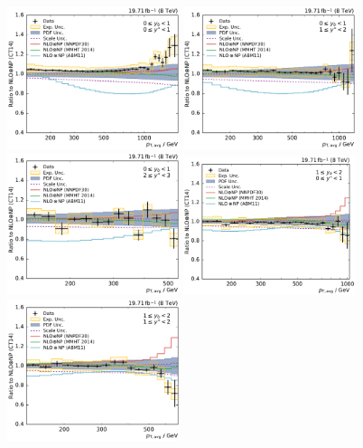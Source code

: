 \begin{figure}[htbp]
    \centering
    \includegraphics[width=0.45\textwidth]{figures/measurement/ratio_to_CT14nlo+np_totcomp_yb0ys0.pdf}\hfill
    \includegraphics[width=0.45\textwidth]{figures/measurement/ratio_to_CT14nlo+np_totcomp_yb0ys1.pdf}
    \includegraphics[width=0.45\textwidth]{figures/measurement/ratio_to_CT14nlo+np_totcomp_yb0ys2.pdf}\hfill
    \includegraphics[width=0.45\textwidth]{figures/measurement/ratio_to_CT14nlo+np_totcomp_yb1ys0.pdf}
    \includegraphics[width=0.45\textwidth]{figures/measurement/ratio_to_CT14nlo+np_totcomp_yb1ys1.pdf}\hfill

\end{figure}

